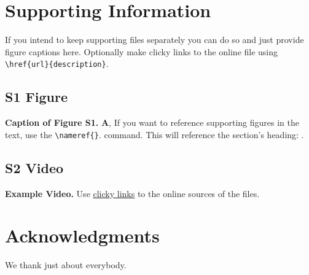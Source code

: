 \documentclass[10pt,letterpaper]{article}
\begin{document}

\section*{Supporting Information}
If you intend to keep supporting files separately you can do so and just provide figure captions here. Optionally make clicky links to the online file using \verb!\href{url}{description}!.

\setcounter{figure}{0}
\renewcommand{\thefigure}{S\arabic{figure}}

\subsection*{S1 Figure}
\label{example_label}
{\bf Caption of Figure S1.} \textbf{A}, If you want to reference supporting figures in the text, use the \verb!\nameref{}!. command. This will reference the section's heading: .

\subsection*{S2 Video}
\label{example_video}
{\bf Example Video.} Use \href{www.youtube.com}{clicky links} to the online sources of the files.


\section*{Acknowledgments}
We thank just about everybody.

\nolinenumbers




\end{document}
